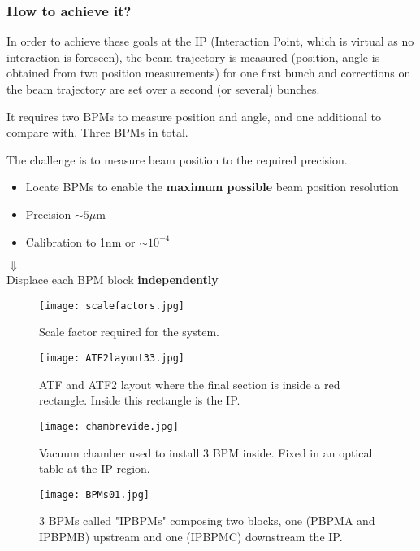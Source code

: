 \subsubsection{How to achieve it?}
In order to achieve these goals at the IP (Interaction Point, which is virtual as no interaction is foreseen), the beam trajectory is measured (position, angle is obtained from two position measurements) for one first bunch and corrections on the beam trajectory are set over a second (or several) bunches.\par
It requires two BPMs to measure position and angle, and one additional to compare with. Three BPMs in total.\par
The challenge is to measure beam position to the required precision.\par
{\LARGE
  \begin{itemize}
   \item Locate BPMs to enable the \textbf{ maximum possible} beam position resolution
   \item Precision $\sim 5\mu$m
   \item Calibration to 1nm or $\sim 10^{-4}$
  \end{itemize}
 \hspace*{5cm}$\Downarrow$\\
 Displace each BPM block \textbf{independently}
 }\par
\begin{figure}[htb]
\begin{center}
  \texttt{[image: scalefactors.jpg]}\caption{Scale factor required for the system.}\label{f-scalefactors}
\end{center}
\end{figure}
 \begin{figure}[htb]
\begin{center}
\texttt{[image: ATF2layout33.jpg]}\caption{ATF and ATF2 layout where the final section is inside a red rectangle. Inside this rectangle is the IP.}\label{f-ATF2layout}
\end{center}
\end{figure}
\begin{figure}[htb]
\begin{center}
\texttt{[image: chambrevide.jpg]}\caption{Vacuum chamber used to install 3 BPM inside. Fixed in an optical table at the IP region.}\label{f-chambrevide}
\end{center}
\end{figure}
\begin{figure}[htb]
 \begin{center}
\texttt{[image: BPMs01.jpg]}\caption{3 BPMs called "IPBPMs" composing two blocks, one (PBPMA and IPBPMB) upstream and one (IPBPMC) downstream the IP.}\label{f-BPMs01}
\end{center}
\end{figure}

